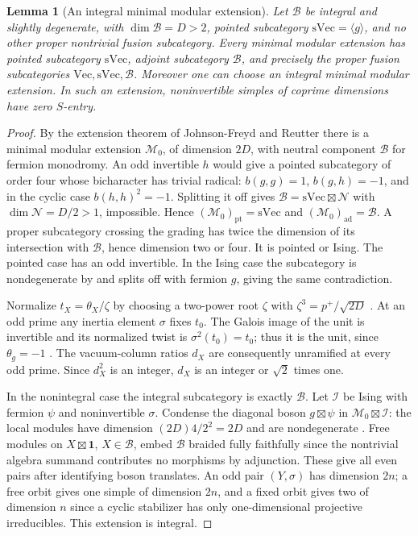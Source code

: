 \documentclass[11pt,a4paper]{article}
\numberwithin{equation}{section}
\newtheorem{lemma}[theorem]{Lemma}
\theoremstyle{remark}
\newcommand{\M}{\mathcal M}
\newcommand{\one}{\mathbf1}
\renewcommand{\Vec}{\mathrm{Vec}}
\newcommand{\ad}{\mathrm{ad}}
\newcommand{\pt}{\mathrm{pt}}
\newcommand{\sVec}{\mathrm{sVec}}
\begin{document}
\begin{lemma}[An integral minimal modular extension]\label{fam:M:4.4}
\label{lem:integral-minimal-extension}
Let $\mathcal B$ be integral and slightly degenerate, with
$\dim\mathcal B=D>2$, pointed subcategory $\sVec=\langle g\rangle$,
and no other proper nontrivial fusion subcategory.
Every minimal modular extension has pointed subcategory $\sVec$,
adjoint subcategory $\mathcal B$, and precisely the proper fusion
subcategories $\Vec,\sVec,\mathcal B$.
Moreover one can choose an integral minimal modular extension.
In such an extension, noninvertible simples of coprime dimensions
have zero $S$-entry.
\end{lemma}
\begin{proof}
By the extension theorem of Johnson-Freyd and Reutter \cite[Corollary~1.3]{JFR} there is a minimal modular extension
$\M_0$, of dimension $2D$, with neutral component $\mathcal B$
for fermion monodromy. An odd invertible $h$ would give a pointed
subcategory of order four whose bicharacter has trivial radical:
$b(g,g)=1$, $b(g,h)=-1$, and in the cyclic case $b(h,h)^2=-1$.
Splitting it off gives $\mathcal B=\sVec\boxtimes\mathcal N$ with
$\dim\mathcal N=D/2>1$, impossible. Hence
$(\M_0)_{\pt}=\sVec$ and $(\M_0)_{\ad}=\mathcal B$.
A proper subcategory crossing the grading has twice the dimension
of its intersection with $\mathcal B$, hence dimension two or four.
It is pointed or Ising. The pointed case has an odd invertible. In the Ising
case the subcategory is nondegenerate by \cite[Corollary~B.12]{DGNO}
and splits off with fermion $g$, giving the same contradiction.

Normalize $t_X=\theta_X/\zeta$ by choosing a two-power root
$\zeta$ with $\zeta^3=p^+/\sqrt{2D}$ \cite[Theorem~6.10]{DLNCongruence}.
At an odd prime any inertia element $\sigma$ fixes $t_0$.
The Galois image of the unit is invertible and its normalized twist
is $\sigma^2(t_0)=t_0$; thus it is the unit, since $\theta_g=-1$
\cite[Theorem~II]{DLNCongruence}. The vacuum-column ratios $d_X$
are consequently unramified at every odd prime. Since $d_X^2$ is an
integer, $d_X$ is an integer or $\sqrt2$ times one.

In the nonintegral case the integral subcategory is exactly
$\mathcal B$. Let $\mathcal I$ be Ising with fermion $\psi$ and
noninvertible $\sigma$. Condense the diagonal boson
$g\boxtimes\psi$ in $\M_0\boxtimes\mathcal I$: the local modules
have dimension $(2D)4/2^2=2D$ and are nondegenerate
\cite[Propositions~4.26, 4.55(i) and~4.56(i)--(ii)]{DGNO}. Free modules on $X\boxtimes\one$,
$X\in\mathcal B$, embed $\mathcal B$ braided fully faithfully since
the nontrivial algebra summand contributes no morphisms by adjunction.
These give all even pairs after identifying boson translates.
An odd pair $(Y,\sigma)$ has dimension $2n$; a free orbit gives
one simple of dimension $2n$, and a fixed orbit gives two of dimension
$n$ since a cyclic stabilizer has only one-dimensional projective
irreducibles. This extension is integral.


\end{proof}
\end{document}
